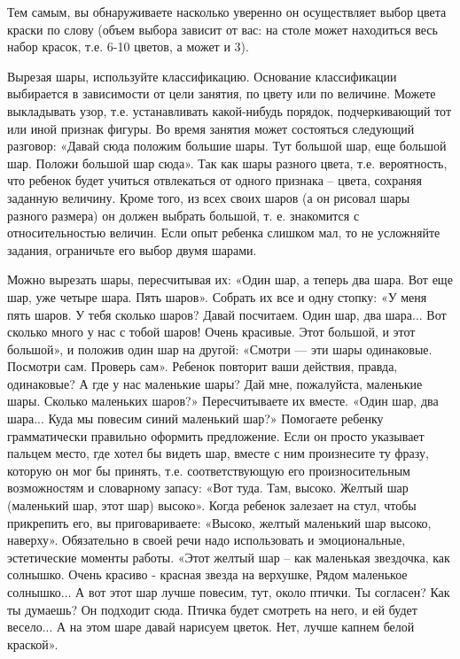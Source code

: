 \documentclass{book}
\begin{document}
Тем самым, вы обнаруживаете насколько уверенно он осуществляет выбор
цвета краски по слову (объем выбора зависит от вас: на столе может
находиться весь набор красок, т.е. 6-10 цветов, а может и 3).

Вырезая шары, используйте классификацию. Основание классификации
выбирается в зависимости от цели занятия, по цвету или по величине.
Можете выкладывать узор, т.е. устанавливать какой-нибудь порядок,
подчеркивающий тот или иной признак фигуры. Во время занятия может
состояться следующий разговор: «Давай сюда положим большие шары. Тут
большой шар, еще большой шар. Положи большой шар сюда». Так как шары
разного цвета, т.е. вероятность, что ребенок будет учиться отвлекаться
от одного признака -- цвета, сохраняя заданную величину. Кроме того, из
всех своих шаров (а он рисовал шары разного размера) он должен выбрать
большой, т. е. знакомится с относительностью величин. Если опыт ребенка
слишком мал, то не усложняйте задания, ограничьте его выбор двумя
шарами.

Можно вырезать шары, пересчитывая их: «Один шар, а теперь два шара. Вот
еще шар, уже четыре шара. Пять шаров». Собрать их все и одну стопку: «У
меня пять шаров. У тебя сколько шаров? Давай посчитаем. Один шар, два
шара... Вот сколько много у нас с тобой шаров! Очень красивые. Этот
большой, и этот большой», и положив один шар на другой: «Смотри --- эти
шары одинаковые. Посмотри сам. Проверь сам». Ребенок повторит ваши
действия, правда, одинаковые? А где у нас маленькие шары? Дай мне,
пожалуйста, маленькие шары. Сколько маленьких шаров?» Пересчитываете их
вместе. «Один шар, два шара... Куда мы повесим синий маленький шар?»
Помогаете ребенку грамматически правильно оформить предложение. Если он
просто указывает пальцем место, где хотел бы видеть шар, вместе с ним
произнесите ту фразу, которую он мог бы принять, т.е. соответствующую
его произносительным возможностям и словарному запасу: «Вот туда. Там,
высоко. Желтый шар (маленький шар, этот шар) высоко». Когда ребенок
залезает на стул, чтобы прикрепить его, вы приговариваете: «Высоко,
желтый маленький шар высоко, наверху». Обязательно в своей речи надо
использовать и эмоциональные, эстетические моменты работы. «Этот желтый
шар -- как маленькая звездочка, как солнышко. Очень красиво - красная
звезда на верхушке, Рядом маленькое солнышко... А вот этот шар лучше
повесим, тут, около птички. Ты согласен? Как ты думаешь? Он подходит
сюда. Птичка будет смотреть на него, и ей будет весело... А на этом шаре
давай нарисуем цветок. Нет, лучше капнем белой краской».
\end{document}
